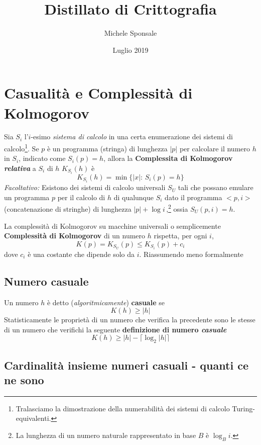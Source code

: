 \documentclass{article}
\title{Distillato di Crittografia}
\author{Michele Sponsale }
\date{Luglio 2019}
\begin{document}
\maketitle

\section{Casualità e Complessità di Kolmogorov}

Sia $S_i$ l'$i$-esimo \emph{sistema di calcolo} in una certa enumerazione dei sistemi di calcolo\footnote{Tralasciamo la dimostrazione della numerabilità dei sistemi di calcolo Turing-equivalenti.}. Se $p$ \`e un programma (stringa) di lunghezza $|p|$ per calcolare il numero $h$ in $S_i$, indicato come $S_i(p)=h$, allora la \textbf{Complessita di Kolmogorov \emph{relativa}} a $S_i$ di $h$ $K_{S_i}(h)$ è
\[
K_{S_i}(h)=\min\{\left|x\right|:\, S_i(p)=h\}
\]
\emph{Facoltativo:}
Esistono dei sistemi di calcolo universali $S_U$ tali che possano emulare un programma $p$ per il calcolo di $h$ di qualunque $S_i$ dato il programma $<p,i>$ (concatenazione di stringhe) di lunghezza $\left|p\right|+\log i$\,,\footnote{La lunghezza di un numero naturale rappresentato in base $B$ è $\log_B i$.} ossia $S_U(p,i) = h$. 

La complessità di Kolmogorov su macchine universali o semplicemente \textbf{Complessità di Kolmogorov} di un numero $h$ rispetta, per ogni $i$,
\[
K(p)=K_{S_U}(p) \le K_{S_i}(p)+c_i
\]
dove $c_i$ è una costante che dipende solo da $i$.
Riassumendo meno formalmente

\subsection{Numero casuale}

Un numero $h$ è detto (\textit{algoritmicamente}) \textbf{casuale} se
\[
K(h)\ge \left|h\right|
\]
Statisticamente le proprietà di un numero che verifica la precedente sono le stesse di un numero che verifichi la seguente \textbf{definizione di numero \emph{casuale}}
\[
K(h) \ge \left|h\right| - \lceil\log_2 \left| h\right|\rceil
\]

\subsection{Cardinalità insieme numeri casuali - quanti ce ne sono}
\end{document}
